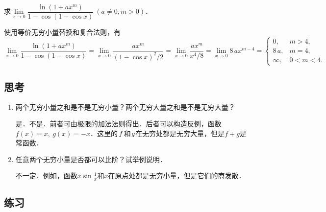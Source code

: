 \begin{example*}
  求\(\lim\limits_{x\to0} \dfrac{\ln(1+ax^m)}{1-\cos(1-\cos x)}\ (a \ne 0, m > 0)\)．\rule[-2ex]{0ex}{3.5ex}

  \begin{remark}
    使用等价无穷小量替换和复合法则，有
    \begin{equation*}
      \lim_{x\to0} \frac{\ln(1+ax^m)}{1-\cos(1-\cos x)}
      = \lim_{x\to0} \frac{ax^m}{(1-\cos x)^2\!/2}
      = \lim_{x\to0} \frac{ax^m}{x^4\!/8}
      = \lim_{x\to0} 8\,ax^{m-4} =
      \begin{cases}
        0, & m > 4, \\
        8\,a, & m = 4, \\
        \infty, & 0 < m < 4.
      \end{cases}
    \end{equation*}
  \end{remark}
\end{example*}

\subsection*{思考}

\begin{enumerate}
\item 两个无穷小量之和是不是无穷小量？两个无穷大量之和是不是无穷大量？

  \ifshowsolp
    是．不是．前者可由极限的加法法则得出．后者可以构造反例，函数\(f(x) = x,\ g(x) = -x\)．这里的\(\,f\mkern1mu\)和\(\mkern1mu g\)在无穷处都是无穷大量，但是\(f+g\)是常函数．
  \fi

\item 任意两个无穷小量是否都可以比阶？试举例说明．

  \ifshowsolp
    不一定．例如，函数\(x \sin\frac1x\)和\(x\)在原点处都是无穷小量，但是它们的商发散．
  \fi
\end{enumerate}

\ifshowex
{}
\subsection*{练习}

